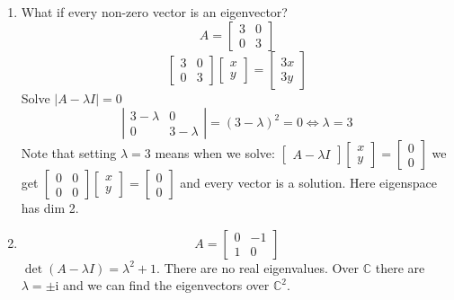 \documentclass{article}
\newcommand{\mathi}{\mathrm{i}}
\begin{document}
\begin{enumerate}
  \item What if every non-zero vector is an eigenvector?
  \[ A = \left[\begin{array}{cc}
       3 & 0\\
       0 & 3
     \end{array}\right] \]
  \[ \left[\begin{array}{cc}
       3 & 0\\
       0 & 3
     \end{array}\right]  \left[\begin{array}{c}
       x\\
       y
     \end{array}\right] = \left[\begin{array}{c}
       3 x\\
       3 y
     \end{array}\right] \]
  Solve $| A - \lambda I | = 0$
  \[ \left|\begin{array}{cc}
       3 - \lambda & 0\\
       0 & 3 - \lambda
     \end{array}\right| = (3 - \lambda)^2 = 0 \Longleftrightarrow \lambda = 3
  \]
  Note that setting $\lambda = 3$ means when we solve: $\left[\begin{array}{c}
    A - \lambda I
  \end{array}\right]  \left[\begin{array}{c}
    x\\
    y
  \end{array}\right] = \left[\begin{array}{c}
    0\\
    0
  \end{array}\right]$ we get $\left[\begin{array}{cc}
    0 & 0\\
    0 & 0
  \end{array}\right] \left[\begin{array}{c}
    x\\
    y
  \end{array}\right] = \left[\begin{array}{c}
    0\\
    0
  \end{array}\right]$ and every vector is a solution. Here eigenspace has dim
  2.
  
  \item
  \[ A = \left[\begin{array}{cc}
       0 & - 1\\
       1 & 0
     \end{array}\right] \]
  $\det (A - \lambda I) = \lambda^2 + 1$. There are no real eigenvalues. Over
  $\mathbb{C}$ there are $\lambda = \pm \mathi$ and we can find the
  eigenvectors over $\mathbb{C}^2$.
  

\end{enumerate}
\end{document}
